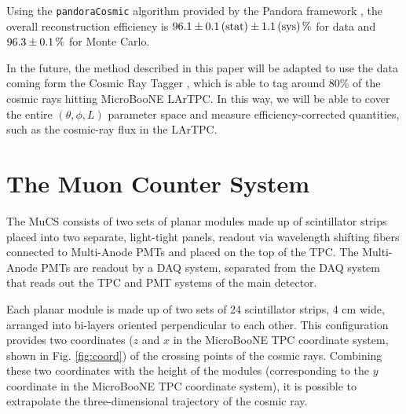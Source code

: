\documentclass[a4paper]{scrartcl}
\begin{document}
Using the \texttt{pan\-do\-ra\-Co\-smic} algorithm \cite{pandoracosmic} provided by the Pandora framework \cite{pandora}, the overall reconstruction efficiency is $96.1\pm0.1\thinspace(\mathrm{stat}) \pm 1.1\thinspace(\mathrm{sys})\thinspace\%$ for data and $96.3\pm0.1\thinspace\%$ for Monte Carlo.

In the future, the method described in this paper will be adapted to use the data coming form the Cosmic Ray Tagger \cite{crt}, which is able to tag around 80\% of the cosmic rays hitting MicroBooNE LArTPC. In this way, we will be able to cover the entire $(\theta,\phi,L)$ parameter space and measure efficiency-corrected quantities, such as the cosmic-ray flux in the LArTPC.

\section{The Muon Counter System}\label{sec:proc}
The MuCS consists of two sets of planar modules made up of scintillator strips placed into two separate, light-tight panels, readout via wavelength shifting fibers connected to Multi-Anode PMTs and placed on the top of the TPC. The Multi-Anode PMTs are readout by a DAQ system, separated from the DAQ system that reads out the TPC and PMT systems of the main detector.

Each planar module is made up of two sets of 24 scintillator strips, 4 cm wide, arranged into bi-layers oriented perpendicular to each other. This configuration provides two coordinates ($z$ and $x$ in the MicroBooNE TPC coordinate system, shown in Fig. \ref{fig:coord}) of the crossing points of the cosmic rays. Combining these two coordinates with the height of the modules (corresponding to the $y$ coordinate in the MicroBooNE TPC coordinate system), it is possible to extrapolate the three-dimensional trajectory of the cosmic ray.
\end{document}
